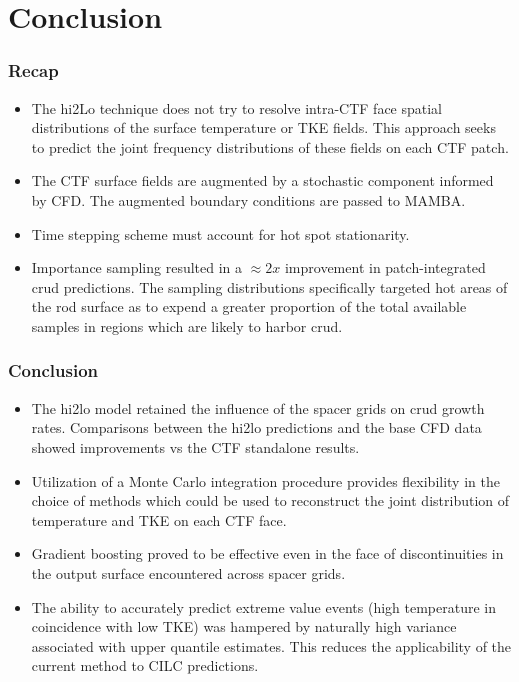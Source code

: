 \documentclass[t, pdftex]{beamer}
\begin{document}
\section{Conclusion}
\begin{frame}
\frametitle{Recap}
\vspace{-16pt}
\begin{itemize}
\item The hi2Lo technique does not try to resolve intra-CTF face spatial distributions
of the surface temperature or TKE fields.  This approach seeks to predict the joint frequency distributions of these fields on each CTF patch.
\item The CTF surface fields are augmented by a stochastic component informed by CFD.  The augmented boundary conditions are passed to MAMBA.
\item Time stepping scheme must account for hot spot stationarity.
\item Importance sampling resulted in a $\approx 2x$ improvement in patch-integrated crud predictions.  The sampling distributions specifically targeted hot areas of the rod surface as to expend a greater proportion of the total available samples in regions which are likely to harbor crud.
\end{itemize}
\end{frame}

\begin{frame}
\frametitle{Conclusion}
\vspace{-16pt}
\begin{itemize}
    \item The hi2lo model retained the influence of the spacer grids on crud growth rates.  Comparisons between the hi2lo predictions and the base CFD data showed improvements vs the CTF standalone results.
    \item Utilization of a Monte Carlo integration procedure provides flexibility in the choice of methods which could be used to reconstruct the joint distribution of temperature and TKE on each CTF face.  
    \item Gradient boosting proved to be effective even in the face of discontinuities in the output surface encountered across spacer grids.    
    \item The ability to accurately predict extreme value events (high temperature in coincidence with low TKE) was hampered by naturally high variance associated with upper quantile estimates.  This reduces the applicability of the current method to CILC predictions.
\end{itemize}
\end{frame}
\end{document}
